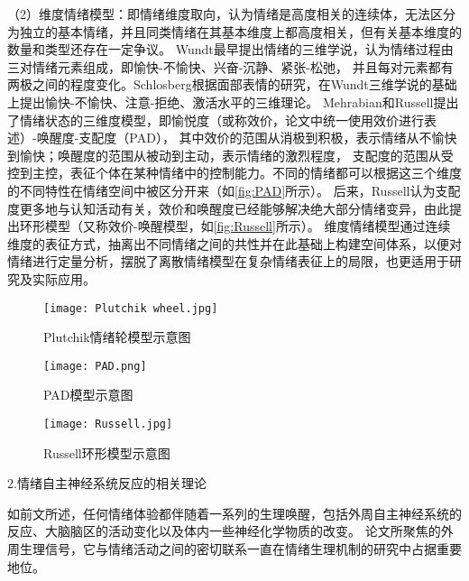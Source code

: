 （2）维度情绪模型：即情绪维度取向，认为情绪是高度相关的连续体，无法区分为独立的基本情绪，并且同类情绪在其基本维度上都高度相关，但有关基本维度的数量和类型还存在一定争议。
Wundt\cite{Wundt1896}最早提出情绪的三维学说，认为情绪过程由三对情绪元素组成，即愉快-不愉快、兴奋-沉静、紧张-松弛，
并且每对元素都有两极之间的程度变化。Schlosberg\cite{Schlosberg1954}根据面部表情的研究，在Wundt三维学说的基础上提出愉快-不愉快、注意-拒绝、激活水平的三维理论。
Mehrabian和Russell\cite{Mehrabian1974}提出了情绪状态的三维度模型，即愉悦度（或称效价，论文中统一使用效价进行表述）-唤醒度-支配度（PAD），
其中效价的范围从消极到积极，表示情绪从不愉快到愉快；唤醒度的范围从被动到主动，表示情绪的激烈程度，
支配度的范围从受控到主控，表征个体在某种情绪中的控制能力。不同的情绪都可以根据这三个维度的不同特性在情绪空间中被区分开来（如\autoref{fig:PAD}所示）。
后来，Russell\cite{Russell1980}认为支配度更多地与认知活动有关，效价和唤醒度已经能够解决绝大部分情绪变异，由此提出环形模型（又称效价-唤醒模型，如\autoref{fig:Russell}所示）。
维度情绪模型通过连续维度的表征方式，抽离出不同情绪之间的共性并在此基础上构建空间体系，以便对情绪进行定量分析，摆脱了离散情绪模型在复杂情绪表征上的局限，也更适用于研究及实际应用。

\setlength{\belowcaptionskip}{-0.3cm}
\begin{figure}[htbp]
    \centering
    \texttt{[image: Plutchik wheel.jpg]}
    \caption[Plutchik情绪轮模型示意图]{ Plutchik情绪轮模型示意图}{\label{fig:Plutchik_wheel}}
\end{figure}

\setlength{\belowcaptionskip}{-0.3cm}
\begin{figure}[htbp]
    \hspace {0.1cm}
	\centering
	\begin{minipage}[l]{0.44\textwidth}
		\hspace {-1cm}
        \centering
		\texttt{[image: PAD.png]}
		\caption{PAD模型示意图}
		\label{fig:PAD}
	\end{minipage} 
	\begin{minipage}[c]{0.53\textwidth}
		\hspace {-2cm}
        \centering
		\texttt{[image: Russell.jpg]}
		\hspace {-2cm}
        \setlength{\abovecaptionskip}{-0.01cm}
        \caption{Russell环形模型示意图}
		\label{fig:Russell}
	\end{minipage}
\end{figure}

2.情绪自主神经系统反应的相关理论

如前文所述，任何情绪体验都伴随着一系列的生理唤醒，包括外周自主神经系统的反应、大脑脑区的活动变化以及体内一些神经化学物质的改变。
论文所聚焦的外周生理信号，它与情绪活动之间的密切联系一直在情绪生理机制的研究中占据重要地位。

